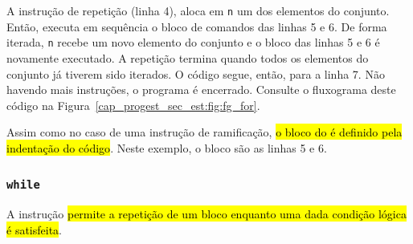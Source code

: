 \begin{ex}
A instrução de repetição {\PYTHONfor} (linha 4), aloca em \lstinline+n+ um dos elementos do conjunto. Então, executa em sequência o bloco de comandos das linhas 5 e 6. De forma iterada, \lstinline+n+ recebe um novo elemento do conjunto e o bloco das linhas 5 e 6 é novamente executado. A repetição termina quando todos os elementos do conjunto já tiverem sido iterados. O código segue, então, para a linha 7. Não havendo mais instruções, o programa é encerrado. Consulte o fluxograma deste código na Figura~\ref{cap_progest_sec_est:fig:fg_for}.

Assim como no caso de uma instrução de ramificação, \hl{o bloco do {\PYTHONfor} é definido pela indentação do código}. Neste exemplo, o bloco são as linhas 5 e 6.

\end{ex}

\subsubsection{\texttt{while}}

A instrução \hl{{\PYTHONwhile} permite a repetição de um bloco enquanto uma dada condição lógica é satisfeita}.

